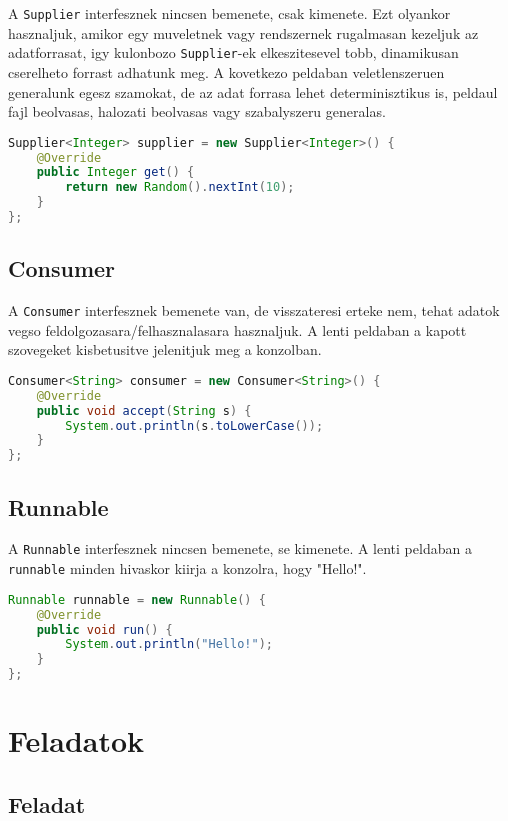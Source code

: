 \documentclass{article}
\let\l\lstinline
\begin{document}
A \l{Supplier} interfesznek nincsen bemenete, csak kimenete. Ezt olyankor hasznaljuk, amikor egy muveletnek vagy rendszernek rugalmasan kezeljuk az adatforrasat, igy kulonbozo \l{Supplier}-ek elkeszitesevel tobb, dinamikusan cserelheto forrast adhatunk meg. A kovetkezo peldaban veletlenszeruen generalunk egesz szamokat, de az adat forrasa lehet determinisztikus is, peldaul fajl beolvasas, halozati beolvasas vagy szabalyszeru generalas.

\begin{lstlisting}[language=Java, caption=Pelda Supplier]
Supplier<Integer> supplier = new Supplier<Integer>() {
	@Override
	public Integer get() {
		return new Random().nextInt(10);
	}
};
\end{lstlisting}

\subsection{Consumer}
A \l{Consumer} interfesznek bemenete van, de visszateresi erteke nem, tehat adatok vegso feldolgozasara/felhasznalasara hasznaljuk. A lenti peldaban a kapott szovegeket kisbetusitve jelenitjuk meg a konzolban.

\begin{lstlisting}[language=Java, caption=Pelda Consumer]
Consumer<String> consumer = new Consumer<String>() {
	@Override
	public void accept(String s) {
		System.out.println(s.toLowerCase());
	}
};
\end{lstlisting}

\subsection{Runnable}

A \l{Runnable} interfesznek nincsen bemenete, se kimenete. A lenti peldaban a \l{runnable} minden hivaskor kiirja a konzolra, hogy "Hello!".

\begin{lstlisting}[language=Java, caption=Pelda Function]
Runnable runnable = new Runnable() {
	@Override
	public void run() {
		System.out.println("Hello!");
	}
};
\end{lstlisting}

\section{Feladatok}

\subsection{Feladat}
\end{document}
